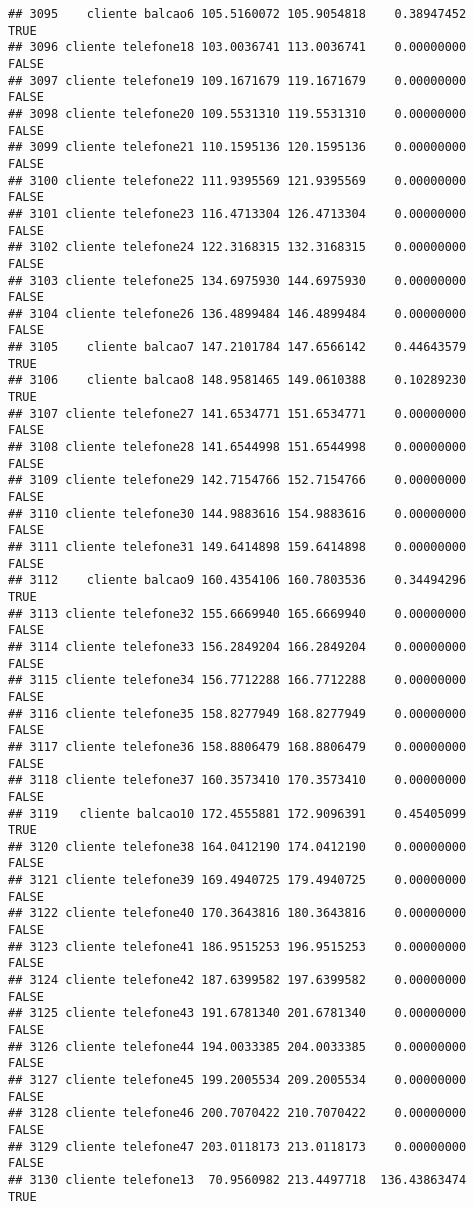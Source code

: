 \documentclass[
]{article}
\begin{document}
\begin{verbatim}
## 3095    cliente balcao6 105.5160072 105.9054818    0.38947452     TRUE
## 3096 cliente telefone18 103.0036741 113.0036741    0.00000000    FALSE
## 3097 cliente telefone19 109.1671679 119.1671679    0.00000000    FALSE
## 3098 cliente telefone20 109.5531310 119.5531310    0.00000000    FALSE
## 3099 cliente telefone21 110.1595136 120.1595136    0.00000000    FALSE
## 3100 cliente telefone22 111.9395569 121.9395569    0.00000000    FALSE
## 3101 cliente telefone23 116.4713304 126.4713304    0.00000000    FALSE
## 3102 cliente telefone24 122.3168315 132.3168315    0.00000000    FALSE
## 3103 cliente telefone25 134.6975930 144.6975930    0.00000000    FALSE
## 3104 cliente telefone26 136.4899484 146.4899484    0.00000000    FALSE
## 3105    cliente balcao7 147.2101784 147.6566142    0.44643579     TRUE
## 3106    cliente balcao8 148.9581465 149.0610388    0.10289230     TRUE
## 3107 cliente telefone27 141.6534771 151.6534771    0.00000000    FALSE
## 3108 cliente telefone28 141.6544998 151.6544998    0.00000000    FALSE
## 3109 cliente telefone29 142.7154766 152.7154766    0.00000000    FALSE
## 3110 cliente telefone30 144.9883616 154.9883616    0.00000000    FALSE
## 3111 cliente telefone31 149.6414898 159.6414898    0.00000000    FALSE
## 3112    cliente balcao9 160.4354106 160.7803536    0.34494296     TRUE
## 3113 cliente telefone32 155.6669940 165.6669940    0.00000000    FALSE
## 3114 cliente telefone33 156.2849204 166.2849204    0.00000000    FALSE
## 3115 cliente telefone34 156.7712288 166.7712288    0.00000000    FALSE
## 3116 cliente telefone35 158.8277949 168.8277949    0.00000000    FALSE
## 3117 cliente telefone36 158.8806479 168.8806479    0.00000000    FALSE
## 3118 cliente telefone37 160.3573410 170.3573410    0.00000000    FALSE
## 3119   cliente balcao10 172.4555881 172.9096391    0.45405099     TRUE
## 3120 cliente telefone38 164.0412190 174.0412190    0.00000000    FALSE
## 3121 cliente telefone39 169.4940725 179.4940725    0.00000000    FALSE
## 3122 cliente telefone40 170.3643816 180.3643816    0.00000000    FALSE
## 3123 cliente telefone41 186.9515253 196.9515253    0.00000000    FALSE
## 3124 cliente telefone42 187.6399582 197.6399582    0.00000000    FALSE
## 3125 cliente telefone43 191.6781340 201.6781340    0.00000000    FALSE
## 3126 cliente telefone44 194.0033385 204.0033385    0.00000000    FALSE
## 3127 cliente telefone45 199.2005534 209.2005534    0.00000000    FALSE
## 3128 cliente telefone46 200.7070422 210.7070422    0.00000000    FALSE
## 3129 cliente telefone47 203.0118173 213.0118173    0.00000000    FALSE
## 3130 cliente telefone13  70.9560982 213.4497718  136.43863474     TRUE

\end{verbatim}
\end{document}
